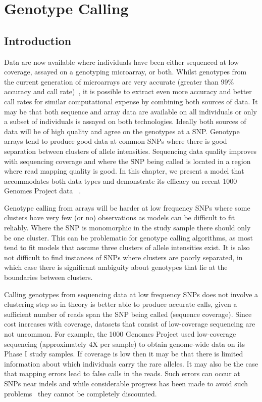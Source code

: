 \clearpage

\chapter{Genotype Calling}

\section{Introduction}

Data are now available where individuals have been either sequenced at low coverage, assayed on a genotyping microarray, or both.  Whilst genotypes from the current generation of microarrays are very accurate (greater than 99\% accuracy and call rate)~\citep{Ritchie2011}, it is possible to extract even more accuracy and better call rates for similar computational expense by combining both sources of data. It may be that both sequence and array data are available on all individuals or only a subset of individuals is assayed on both technologies. Ideally both sources of data will be of high quality and agree on the genotypes at a SNP. Genotype arrays tend to produce good data at common SNPs where there is good separation between clusters of allele intensities.  Sequencing data quality improves with sequencing coverage and where the SNP being called is located in a region where read mapping quality is good. In this chapter, we present a model that accommodates both data types and demonstrate its efficacy on recent 1000 Genomes Project data~\citep{Consortium2010,1000G_phase1} .

Genotype calling from arrays will be harder at low frequency SNPs where some clusters have very few (or no) observations as models can be difficult to fit reliably. Where the SNP is monomorphic in the study sample there should only be one cluster. This can be problematic for genotype calling algorithms, as most tend to fit models that assume three clusters of allele intensities exist.  It is also not difficult to find instances of SNPs where clusters are poorly separated, in which case there is significant ambiguity about genotypes that lie at the boundaries between clusters.  

Calling genotypes from sequencing data at low frequency SNPs does not involve a clustering step so in theory is better able to produce accurate calls, given a sufficient number of reads span the SNP being called (sequence coverage). Since cost increases with coverage, datasets that consist of low-coverage sequencing are not uncommon. For example, the 1000 Genomes Project used low-coverage sequencing (approximately 4X per sample) to obtain genome-wide data on its Phase I study samples. If coverage is low then it may be that there is limited information about which individuals carry the rare alleles. It may also be the case that mapping errors lead to false calls in the reads. Such errors can occur at SNPs near indels and while considerable progress has been made to avoid such problems~\citep{lunter2011stampy,li2011improving} they cannot be completely discounted. 

